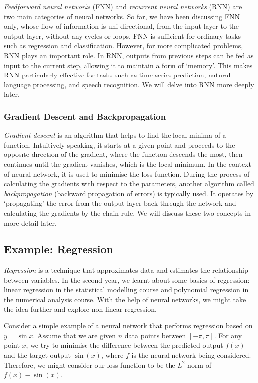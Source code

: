 \documentclass[a4paper,11pt, titlepage]{article}
\theoremstyle{definition}
\theoremstyle{plain}
\theoremstyle{remark}
\begin{document}
\textit{Feedforward neural networks} (FNN) and \textit{recurrent neural networks} (RNN) are two main categories of neural networks. So far, we have been discussing FNN only, whose flow of information is uni-directional, from the input layer to the output layer, without any cycles or loops. FNN is sufficient for ordinary tasks such as regression and classification. However, for more complicated problems, RNN plays an important role. In RNN, outputs from previous steps can be fed as input to the current step, allowing it to maintain a form of ‘memory’. This makes RNN particularly effective for tasks such as time series prediction, natural language processing, and speech recognition. We will delve into RNN more deeply later.

\subsubsection{Gradient Descent and Backpropagation}

\textit{Gradient descent} is an algorithm that helps to find the local minima of a function. Intuitively speaking, it starts at a given point and proceeds to the opposite direction of the gradient, where the function descends the most, then continues until the gradient vanishes, which is the local minimum. In the context of neural network, it is used to minimise the loss function. During the process of calculating the gradients with respect to the parameters, another algorithm called \textit{backpropagation} (backward propagation of errors) is typically used. It operates by ‘propagating’ the error from the output layer back through the network and calculating the gradients by the chain rule. We will discuss these two concepts in more detail later.

\subsection{Example: Regression}

\textit{Regression} is a technique that approximates data and estimates the relationship between variables. In the second year, we learnt about some basics of regression: linear regression in the statistical modelling course and polynomial regression in the numerical analysis course. With the help of neural networks, we might take the idea further and explore non-linear regression.

Consider a simple example of a neural network that performs regression based on $y = \sin x$. Assume that we are given $n$ data points between $[-\pi, \pi]$. For any point $x$, we try to minimise the difference between the predicted output $f(x)$ and the target output $\sin (x)$, where $f$ is the neural network being considered. Therefore, we might consider our loss function to be the $L^2$-norm of $f(x) - \sin (x)$.
\end{document}
